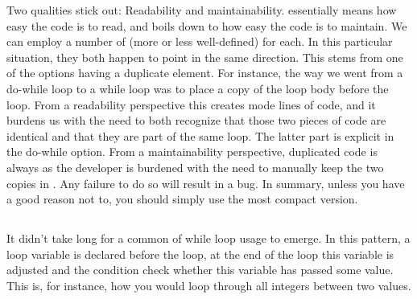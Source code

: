 Two qualities stick out: Readability and maintainability.  essentially means how easy the code is to read, and  boils down to how easy the code is to maintain. We can employ a number of (more or less well-defined)  for each. In this particular situation, they both happen to point in the same direction. This stems from one of the options having a duplicate element. For instance, the way we went from a do-while loop to a while loop was to place a copy of the loop body before the loop. From a readability perspective this creates mode lines of code, and it burdens us with the need to both recognize that those two pieces of code are identical and that they are part of the same loop. The latter part is explicit in the do-while option. From a maintainability perspective, duplicated code is always  as the developer is burdened with the need to manually keep the two copies in . Any failure to do so will result in a bug. In summary, unless you have a good reason not to, you should simply use the most compact version.

\subsection{}

It didn't take long for a common  of while loop usage to emerge. In this pattern, a loop variable is declared before the loop, at the end of the loop this variable is adjusted and the condition check whether this variable has passed some value. This is, for instance, how you would loop through all integers between two values.

